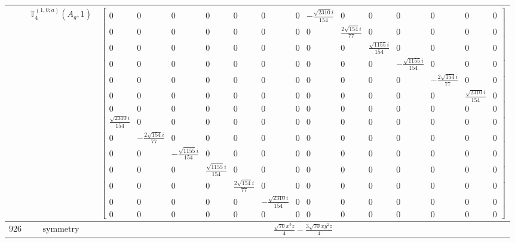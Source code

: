 \documentclass[fleqn,8pt,landscape]{jsarticle}
\begin{document}
\begin{longtable}{ccc}
$  $ & $ \mathbb{T}_{4}^{(1,0;a)}(A_{g},1) $ & $ \begin{bmatrix} 0 & 0 & 0 & 0 & 0 & 0 & 0 & - \frac{\sqrt{2310} i}{154} & 0 & 0 & 0 & 0 & 0 & 0 \\ 0 & 0 & 0 & 0 & 0 & 0 & 0 & 0 & \frac{2 \sqrt{154} i}{77} & 0 & 0 & 0 & 0 & 0 \\ 0 & 0 & 0 & 0 & 0 & 0 & 0 & 0 & 0 & \frac{\sqrt{1155} i}{154} & 0 & 0 & 0 & 0 \\ 0 & 0 & 0 & 0 & 0 & 0 & 0 & 0 & 0 & 0 & - \frac{\sqrt{1155} i}{154} & 0 & 0 & 0 \\ 0 & 0 & 0 & 0 & 0 & 0 & 0 & 0 & 0 & 0 & 0 & - \frac{2 \sqrt{154} i}{77} & 0 & 0 \\ 0 & 0 & 0 & 0 & 0 & 0 & 0 & 0 & 0 & 0 & 0 & 0 & \frac{\sqrt{2310} i}{154} & 0 \\ 0 & 0 & 0 & 0 & 0 & 0 & 0 & 0 & 0 & 0 & 0 & 0 & 0 & 0 \\ \frac{\sqrt{2310} i}{154} & 0 & 0 & 0 & 0 & 0 & 0 & 0 & 0 & 0 & 0 & 0 & 0 & 0 \\ 0 & - \frac{2 \sqrt{154} i}{77} & 0 & 0 & 0 & 0 & 0 & 0 & 0 & 0 & 0 & 0 & 0 & 0 \\ 0 & 0 & - \frac{\sqrt{1155} i}{154} & 0 & 0 & 0 & 0 & 0 & 0 & 0 & 0 & 0 & 0 & 0 \\ 0 & 0 & 0 & \frac{\sqrt{1155} i}{154} & 0 & 0 & 0 & 0 & 0 & 0 & 0 & 0 & 0 & 0 \\ 0 & 0 & 0 & 0 & \frac{2 \sqrt{154} i}{77} & 0 & 0 & 0 & 0 & 0 & 0 & 0 & 0 & 0 \\ 0 & 0 & 0 & 0 & 0 & - \frac{\sqrt{2310} i}{154} & 0 & 0 & 0 & 0 & 0 & 0 & 0 & 0 \\ 0 & 0 & 0 & 0 & 0 & 0 & 0 & 0 & 0 & 0 & 0 & 0 & 0 & 0 \end{bmatrix} $ \\ \hline
$ 926 $ & $ \text{symmetry} $ & $ \frac{\sqrt{70} x^{3} z}{4} - \frac{3 \sqrt{70} x y^{2} z}{4} $ \\

\end{longtable}
\end{document}
